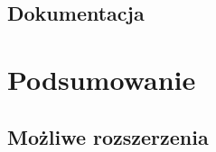 \documentclass{pracamgr}
\begin{document}
%
%
\section{Dokumentacja}


%
%
\chapter{Podsumowanie}

%
%
\section{Możliwe rozszerzenia}


\begin{thebibliography}{99}





\end{thebibliography}
\end{document}
